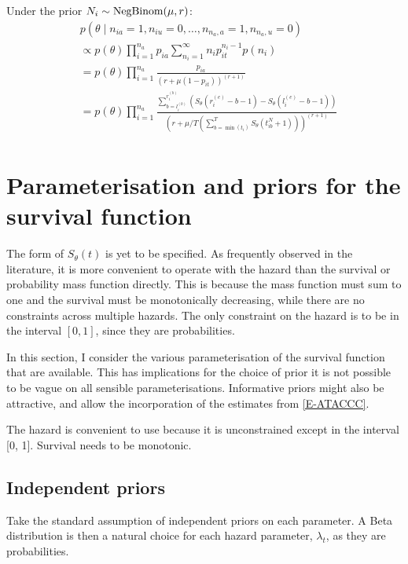 \documentclass[thesis.tex]{subfiles}
\begin{document}
Under the prior $N_i \sim \text{NegBinom}(\mu, r)$:
\begin{align}
&p(\theta \mid n_{ia} = 1, n_{iu} = 0, \dots, n_{n_a,a} = 1, n_{n_a,u} = 0) \\
&\propto p(\theta) \prod_{i=1}^{n_a} p_{ia} \sum_{n_i=1}^\infty n_i p_{it}^{n_i- 1} p(n_i) \\
&= p(\theta) \prod_{i=1}^{n_a} \frac{p_{ia}}{(r+\mu (1-p_{it}))^{(r+1)}} \\
&= p(\theta) \prod_{i=1}^{n_a} \frac{\sum_{b=l_i^{(b)}}^{r_i^{(b)}} \left( S_\theta(r_i^{(e)} - b - 1) - S_\theta(l_i^{(e)} - b - 1) \right)}{\left( r+\mu/T \left( \sum_{b=\min(t_i)}^T S_\theta(t_{ib}^N + 1) \right) \right)^{(r+1)}} \\
\end{align}

\section{Parameterisation and priors for the survival function} \label{perf-test:sec:parameters-priors}

The form of $S_\theta(t)$ is yet to be specified.
As frequently observed in the literature, it is more convenient to operate with the hazard than the survival or probability mass function directly.
This is because the mass function must sum to one and the survival must be monotonically decreasing, while there are no constraints across multiple hazards.
The only constraint on the hazard is to be in the interval $[0, 1]$, since they are probabilities.

In this section, I consider the various parameterisation of the survival function that are available.
This has implications for the choice of prior it is not possible to be vague on all sensible parameterisations.
Informative priors might also be attractive, and allow the incorporation of the estimates from \cref{E-ATACCC}.

The hazard is convenient to use because it is unconstrained except in the interval [0, 1].
Survival needs to be monotonic.

\subsection{Independent priors}
Take the standard assumption of independent priors on each parameter.
A Beta distribution is then a natural choice for each hazard parameter, $\lambda_t$, as they are probabilities.
\end{document}
